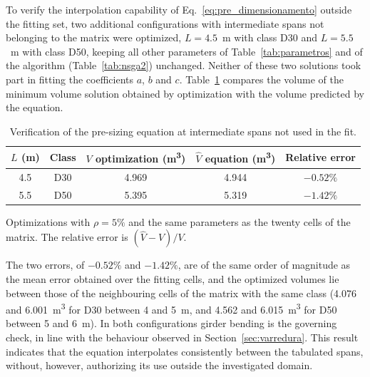 To verify the interpolation capability of Eq.~\eqref{eq:pre_dimensionamento} outside the fitting set, two additional configurations with intermediate spans not belonging to the matrix were optimized, $L = 4.5$~m with class D30 and $L = 5.5$~m with class D50, keeping all other parameters of Table~\ref{tab:parametros} and of the algorithm (Table~\ref{tab:nsga2}) unchanged.
Neither of these two solutions took part in fitting the coefficients $a$, $b$ and $c$.
Table~\ref{tab:validacao_equacao} compares the volume of the minimum volume solution obtained by optimization with the volume predicted by the equation.

\begin{table}[!ht]
\caption{Verification of the pre-sizing equation at intermediate spans not used in the fit.\label{tab:validacao_equacao}}
\begin{threeparttable}
\begin{tabular*}{\columnwidth}{@{\extracolsep\fill}ccccc@{\extracolsep\fill}}
\toprule
$L$ (m) & Class & $V$ optimization (m\textsuperscript{3}) & $\hat{V}$ equation (m\textsuperscript{3}) & Relative error \\
\midrule
4.5 & D30 & 4.969 & 4.944 & $-0.52\%$ \\
5.5 & D50 & 5.395 & 5.319 & $-1.42\%$ \\
\bottomrule
\end{tabular*}
\begin{tablenotes}
\footnotesize
\item Optimizations with $\rho = 5\%$ and the same parameters as the twenty cells of the matrix. The relative error is $(\hat{V} - V)/V$.
\end{tablenotes}
\end{threeparttable}
\end{table}

The two errors, of $-0.52\%$ and $-1.42\%$, are of the same order of magnitude as the mean error obtained over the fitting cells, and the optimized volumes lie between those of the neighbouring cells of the matrix with the same class (4.076 and 6.001~m\textsuperscript{3} for D30 between 4 and 5~m, and 4.562 and 6.015~m\textsuperscript{3} for D50 between 5 and 6~m).
In both configurations girder bending is the governing check, in line with the behaviour observed in Section~\ref{sec:varredura}.
This result indicates that the equation interpolates consistently between the tabulated spans, without, however, authorizing its use outside the investigated domain.
